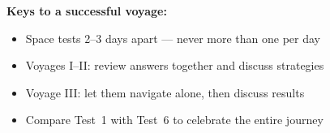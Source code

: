 {\begin{tcolorbox}
    \medskip
    \textbf{Keys to a successful voyage:}
    \begin{itemize}[leftmargin=*, itemsep=1pt]
        \item Space tests 2--3 days apart --- never more than one per day
        \item Voyages I--II: review answers together and discuss strategies
        \item Voyage III: let them navigate alone, then discuss results
        \item Compare Test~1 with Test~6 to celebrate the entire journey
    \end{itemize}
\end{tcolorbox}

}

\newpage
